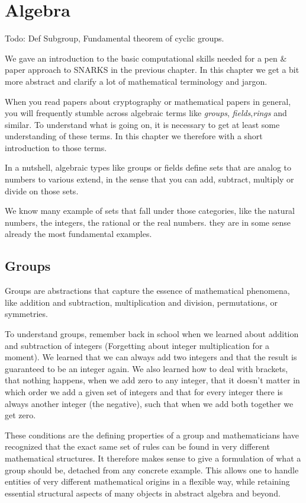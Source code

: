 \chapter{Algebra}
Todo: Def Subgroup,
Fundamental theorem of cyclic groups.

We gave an introduction to the basic computational skills needed for a pen \& paper approach to SNARKS in the previous chapter. In this chapter we get a bit more abstract and clarify a lot of mathematical terminology and jargon.

When you read papers about cryptography or mathematical papers in general, you will frequently stumble across algebraic terms like \textit{groups}, \textit{fields},\textit{rings} and similar. To understand what is going on, it is necessary to get at least some understanding of these terms. In this chapter we therefore with a short introduction to those terms.

In a nutshell, algebraic types like groups or fields define sets that are analog to numbers to various extend, in the sense that you can add, subtract, multiply or divide on those sets.

We know many example of sets that fall under those categories, like the natural numbers, the integers, the rational or the real numbers. they are in some sense already the most fundamental examples.

\section{Groups} Groups are abstractions that capture the essence of mathematical phenomena, like addition and subtraction, multiplication and division, permutations, or symmetries.

To understand groups, remember back in school when we learned about addition and subtraction of integers (Forgetting about integer multiplication for a moment). We learned that we can always add two integers and that the result is guaranteed to be an integer again. We also learned how to deal with brackets, that nothing happens, when we add zero to any integer, that it doesn't matter in which order we add a given set of integers and that for every integer there is always another integer (the negative), such that when we add both together we get zero.

These conditions are the defining properties of a group and mathematicians have recognized that the exact same set of rules can be found in very different mathematical structures. It therefore makes sense to give a formulation of what a group should be, detached from any concrete example. This allows one to handle entities of very different mathematical origins in a flexible way, while retaining essential structural aspects of many objects in abstract algebra and beyond.

